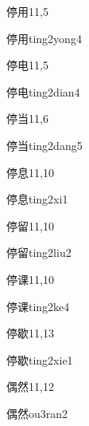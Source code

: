 \begin{entry}{停用}{11,5}
  \begin{phonetics}{停用}{ting2yong4}
  \end{phonetics}
\end{entry}

\begin{entry}{停电}{11,5}
  \begin{phonetics}{停电}{ting2dian4}
  \end{phonetics}
\end{entry}

\begin{entry}{停当}{11,6}
  \begin{phonetics}{停当}{ting2dang5}
  \end{phonetics}
\end{entry}

\begin{entry}{停息}{11,10}
  \begin{phonetics}{停息}{ting2xi1}
  \end{phonetics}
\end{entry}

\begin{entry}{停留}{11,10}
  \begin{phonetics}{停留}{ting2liu2}
  \end{phonetics}
\end{entry}

\begin{entry}{停课}{11,10}
  \begin{phonetics}{停课}{ting2ke4}
  \end{phonetics}
\end{entry}

\begin{entry}{停歇}{11,13}
  \begin{phonetics}{停歇}{ting2xie1}
  \end{phonetics}
\end{entry}

\begin{entry}{偶然}{11,12}
  \begin{phonetics}{偶然}{ou3ran2}
  \end{phonetics}
\end{entry}


